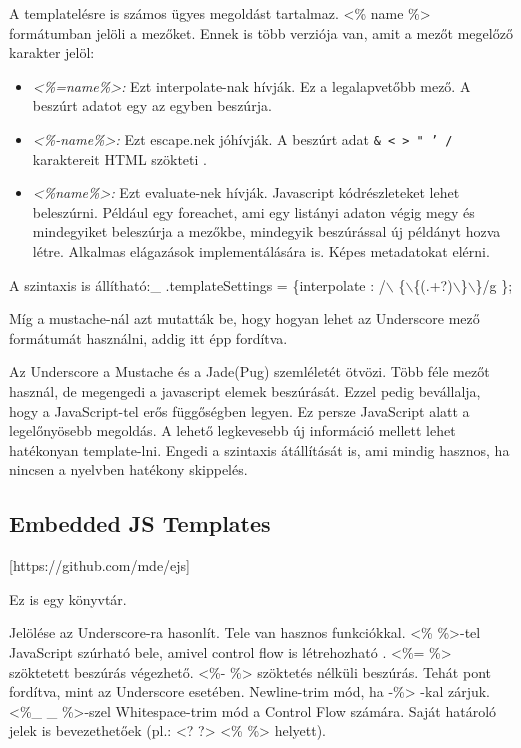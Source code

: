 A templatelésre is számos ügyes megoldást tartalmaz.
<\% name \%> formátumban jelöli a mezőket.
Ennek is több verziója van, amit a mezőt megelőző karakter jelöl:
\begin{itemize}
\item \emph{<\%=name\%>:}
Ezt interpolate-nak hívják. 
Ez a legalapvetőbb mező.
A beszúrt adatot egy az egyben beszúrja.
\item \emph{<\%-name\%>:}
Ezt escape.nek jóhívják.
A beszúrt adat \texttt{\& < > " ' /} karaktereit HTML szökteti .
\item \emph{<\%name\%>:}
Ezt evaluate-nek hívják.
Javascript kódrészleteket lehet beleszúrni.
Például egy foreachet, ami egy listányi adaton végig megy és mindegyiket beleszúrja a mezőkbe, mindegyik beszúrással új példányt hozva létre.
Alkalmas elágazások implementálására is.
Képes metadatokat elérni.
\end{itemize}

A szintaxis is állítható:\_ .templateSettings = \{interpolate : /$\backslash$ \{$\backslash$\{(.+?)$\backslash$\}$\backslash$\}/g \};

Míg a mustache-nál azt mutatták be, hogy hogyan lehet az Underscore mező formátumát használni, addig itt épp fordítva. 

Az Underscore a Mustache és a Jade(Pug) szemléletét ötvözi.
Több féle mezőt használ, de megengedi a javascript elemek beszúrását.
Ezzel pedig bevállalja, hogy a JavaScript-tel erős függőségben legyen.
Ez persze JavaScript alatt a legelőnyösebb megoldás.
A lehető legkevesebb új információ mellett lehet hatékonyan template-lni.
Engedi a szintaxis átállítását is, ami mindig hasznos, ha nincsen a nyelvben hatékony skippelés.

\subsection{Embedded JS Templates}
 [https://github.com/mde/ejs]

Ez is egy könyvtár.

Jelölése az Underscore-ra hasonlít.
Tele van hasznos funkciókkal.
<\% \%>-tel JavaScript szúrható bele, amivel control flow is létrehozható .
<\%= \%> szöktetett beszúrás végezhető. 
<\%-  \%> szöktetés nélküli beszúrás.
Tehát pont fordítva, mint az Underscore esetében.
Newline-trim mód, ha -\%> -kal zárjuk.
<\%\_  \_ \%>-szel Whitespace-trim mód a Control Flow számára. 
Saját határoló jelek is bevezethetőek (pl.: <? ?> <\% \%> helyett).

